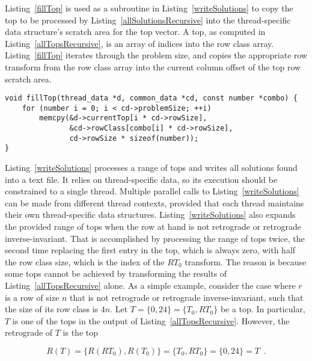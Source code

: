 Listing~\ref{fillTop} is used as a subroutine in Listing~\ref{writeSolutions} to copy the top to be processed by Listing~\ref{allSolutionsRecursive} into the thread-specific data structure's scratch area for the top vector. A top, as computed in Listing~\ref{allTopsRecursive}, is an array of indices into the row class array. Listing~\ref{fillTop} iterates through the problem size, and copies the appropriate row transform from the row class array into the current column offset of the top row scratch area.

\begin{lstlisting}[caption={Refreshing the top row scratch area.},label={fillTop}]
void fillTop(thread_data *d, common_data *cd, const number *combo) {
    for (number i = 0; i < cd->problemSize; ++i)
        memcpy(&d->currentTop[i * cd->rowSize],
               &cd->rowClass[combo[i] * cd->rowSize],
               cd->rowSize * sizeof(number));
}
\end{lstlisting}

Listing~\ref{writeSolutions} processes a range of tops and writes all solutions found into a text file. It relies on thread-specific data, so its execution should be constrained to a single thread. Multiple parallel calls to Listing~\ref{writeSolutions} can be made from different thread contexts, provided that each thread maintains their own thread-specific data structures. Listing~\ref{writeSolutions} also expands the provided range of tops when the row at hand is not retrograde or retrograde inverse-invariant. That is accomplished by processing the range of tops twice, the second time replacing the first entry in the top, which is always zero, with half the row class size, which is the index of the $RT_0$ transform. The reason is because some tops cannot be achieved by transforming the results of Listing~\ref{allTopsRecursive} alone. As a simple example, consider the case where $r$ is a row of size $n$ that is not retrograde or retrograde inverse-invariant, such that the size of its row class is $4n$. Let $T = \{0, 24\} = \{T_0, RT_0\}$ be a top. In particular, $T$ is one of the tops in the output of Listing~\ref{allTopsRecursive}. However, the retrograde of $T$ is the top

\begin{equation}
    R(T) = \{R(RT_0), R(T_0)\} = \{T_0, RT_0\} = \{0, 24\} = T \enspace.
\end{equation}

